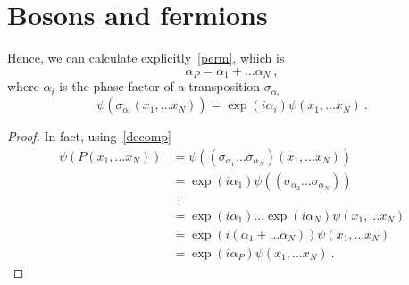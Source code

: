 \section{Bosons and fermions}

    Hence, we can calculate explicitly~\eqref{perm}, which is 
    \begin{equation}
        \alpha_P = \alpha_1 + \ldots \alpha_N~,
    \end{equation}
    where $\alpha_i$ is the phase factor of a transposition $\sigma_{\alpha_i}$
    \begin{equation*}
        \psi(\sigma_{\alpha_i}(x_1,\ldots x_N)) = \exp(i \alpha_i) \psi (x_1,\ldots x_N) ~.
    \end{equation*}
    \begin{proof}
        In fact, using~\eqref{decomp}
        \begin{equation*}
        \begin{aligned}
        \psi(P(x_1,\ldots x_N)) & = \psi((\sigma_{\alpha_1} \ldots \sigma_{\alpha_N}) (x_1,\ldots x_N)) \\ & = \exp (i \alpha_1) \psi((\sigma_{\alpha_2} \ldots \sigma_{\alpha_N}) ) \\ & ~~ \vdots \\ & = \exp (i \alpha_1) \ldots \exp (i \alpha_N) \psi(x_1,\ldots x_N) \\ & = \exp (i (\alpha_1 + \ldots \alpha_N)) \psi(x_1,\ldots x_N) \\ &  = \exp (i \alpha_P) \psi(x_1,\ldots x_N)~.
        \end{aligned}
        \end{equation*}
    \end{proof}

